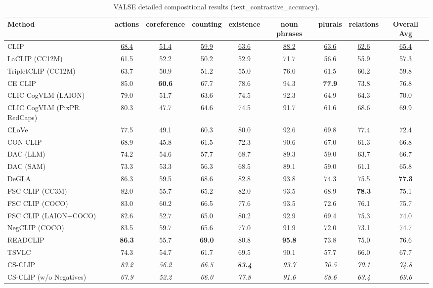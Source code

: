 \begin{table}[t]
  \centering
  \scriptsize
  \caption{VALSE detailed compositional results (text_contrastive_accuracy).}
  \label{tab:VALSE_detailed}
  \begin{adjustbox}{max width=\textwidth}
  \setlength{\tabcolsep}{2pt}
  \begin{tabular}{p{5cm}c|c|c|c|c|c|c|c}
    \toprule
    Method & actions & coreference & counting & existence & noun phrases & plurals & relations & Overall Avg \\
    \midrule
    CLIP & \underline{68.4} & \underline{51.4} & \underline{59.9} & \underline{63.6} & \underline{88.2} & \underline{63.6} & \underline{62.6} & \underline{65.4} \\
    \midrule
    LaCLIP (CC12M) & 61.5 & 52.2 & 50.2 & 52.9 & 71.7 & 56.6 & 55.9 & 57.3 \\
    TripletCLIP (CC12M) & 63.7 & 50.9 & 51.2 & 55.0 & 76.0 & 61.5 & 60.2 & 59.8 \\
    \midrule
    CE CLIP & 85.0 & \textbf{60.6} & 67.7 & 78.6 & 94.3 & \textbf{77.9} & 73.8 & 76.8 \\
    CLIC CogVLM (LAION) & 79.0 & 51.7 & 63.6 & 74.5 & 92.3 & 64.9 & 64.3 & 70.0 \\
    CLIC CogVLM (PixPR RedCaps) & 80.3 & 47.7 & 64.6 & 74.5 & 91.7 & 61.6 & 68.6 & 69.9 \\
    CLoVe & 77.5 & 49.1 & 60.3 & 80.0 & 92.6 & 69.8 & 77.4 & 72.4 \\
    CON CLIP & 68.9 & 45.8 & 61.5 & 72.3 & 90.6 & 67.0 & 61.3 & 66.8 \\
    DAC (LLM) & 74.2 & 54.6 & 57.7 & 68.7 & 89.3 & 59.0 & 63.7 & 66.7 \\
    DAC (SAM) & 73.3 & 53.3 & 56.3 & 68.5 & 89.1 & 59.0 & 61.1 & 65.8 \\
    DeGLA & 86.3 & 59.5 & 68.6 & 82.8 & 93.8 & 74.3 & 75.5 & \textbf{77.3} \\
    FSC CLIP (CC3M) & 82.0 & 55.7 & 65.2 & 82.0 & 93.5 & 68.9 & \textbf{78.3} & 75.1 \\
    FSC CLIP (COCO) & 83.0 & 60.2 & 66.5 & 77.6 & 93.5 & 72.6 & 76.1 & 75.7 \\
    FSC CLIP (LAION+COCO) & 82.6 & 52.7 & 65.0 & 80.2 & 92.9 & 69.4 & 75.3 & 74.0 \\
    NegCLIP (COCO) & 83.5 & 59.7 & 65.6 & 77.0 & 91.9 & 72.0 & 73.1 & 74.7 \\
    READCLIP & \textbf{86.3} & 55.7 & \textbf{69.0} & 80.8 & \textbf{95.8} & 73.8 & 75.0 & 76.6 \\
    TSVLC & 74.3 & 54.7 & 61.7 & 69.5 & 90.1 & 57.7 & 66.0 & 67.7 \\
    \midrule
    CS-CLIP & \emph{83.2} & \emph{56.2} & \emph{66.5} & \emph{\textbf{83.4}} & \emph{93.7} & \emph{70.5} & \emph{70.1} & \emph{74.8} \\
    CS-CLIP (w/o Negatives) & \emph{67.9} & \emph{52.2} & \emph{66.0} & \emph{77.8} & \emph{91.6} & \emph{68.6} & \emph{63.4} & \emph{69.6} \\
    \bottomrule
  \end{tabular}
  \end{adjustbox}
\end{table}